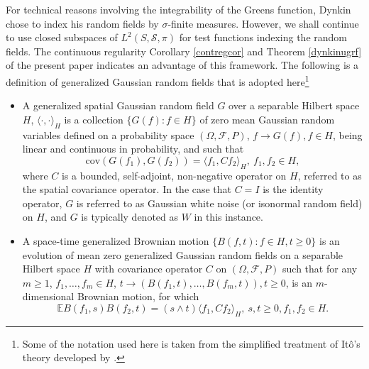 \documentclass[11pt]{article}
\numberwithin{equation}{section}
\theoremstyle{definition}
\theoremstyle{remark}
\theoremstyle{definition}
\begin{document}
 For technical reasons involving the integrability
of the Greens function, Dynkin chose to index his 
random fields by $\sigma$-finite measures.  However,
we shall continue to use closed
subspaces of  $L^2(S,\mathcal{S},\pi)$ 
 for test functions indexing the
random fields.  The continuous regularity 
Corollary \ref{contregcor} and Theorem \ref{dynkinugrf} of the present paper 
indicates an advantage of this framework.
The following is a 
definition of generalized Gaussian random fields that
is adopted here\footnote{Some of the notation used here
is taken from the simplified treatment of It\^o's theory developed by \cite{Farisito}.} 
\begin{defin}\label{spacebm}
\begin{itemize}
\item[i.] A  generalized spatial
Gaussian random field $G$ over a 
separable Hilbert space $H$, 
$\langle\cdot,\cdot\rangle_H$ is a collection
$\{G(f):f\in H\}$ of zero mean
Gaussian
random variables defined on a probability space
$(\Omega, {\mathcal F}, P)$, $f\to G(f), f\in  H$,
being linear and continuous
in probability, and  such that 
\begin{equation*}
\text{cov}(G(f_1),G(f_2)) = \langle f_1,Cf_2\rangle_H, \ f_1,f_2\in H,
\end{equation*}
where $C$ is a bounded, self-adjoint, non-negative operator
on $H$, referred to as the spatial covariance operator.  In the
case that $C=I$ is the identity operator, $G$ is referred to
as Gaussian white noise (or isonormal 
random field) on $H$, and $G$ is typically denoted as
 $W$ in this instance.  
 \item[ii.] A space-time generalized Brownian motion
$\{B(f,t):f\in H, t\ge 0\}$ is an evolution of mean 
zero generalized Gaussian random fields
on a separable
 Hilbert space $H$ with covariance operator $C$ 
 on  $(\Omega,\mathcal{F},P)$ such that
for any $m\ge 1$, $f_1,\dots,f_m\in H$, $t\to (B(f_1,t),\dots,B(f_m,t)), t\ge 0$,
is an $m$-dimensional  Brownian motion, for which
\begin{equation}\label{cylwhite}
{\mathbb E}B(f_1,s)B(f_2,t) = (s\wedge t)\langle f_1,Cf_2\rangle_H, \  s,t\ge 0, f_1,f_2\in H.
\end{equation}
\end{itemize}
 \end{defin}
\end{document}
